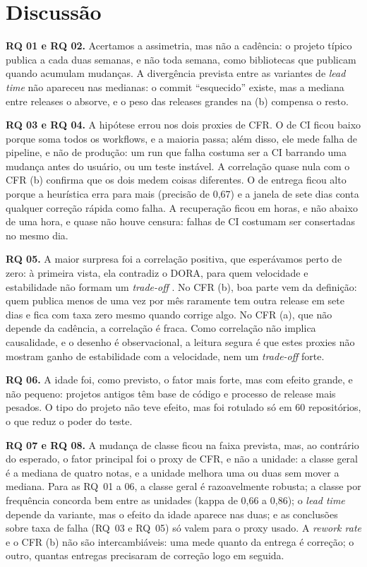 \documentclass[12pt]{article}
\begin{document}
\section{Discussão}
\label{sec:discussao}

\textbf{RQ 01 e RQ 02.} Acertamos a assimetria, mas não a cadência: o projeto
típico publica a cada duas semanas, e não toda semana, como bibliotecas que
publicam quando acumulam mudanças. A divergência prevista entre as variantes de
\emph{lead time} não apareceu nas medianas: o commit ``esquecido'' existe, mas a
mediana entre releases o absorve, e o peso das releases grandes na (b) compensa
o resto.

\textbf{RQ 03 e RQ 04.} A hipótese errou nos dois proxies de CFR. O de CI ficou
baixo porque soma todos os workflows, e a maioria passa; além disso, ele mede
falha de pipeline, e não de produção: um run que falha costuma ser a CI barrando
uma mudança antes do usuário, ou um teste instável. A correlação quase nula com
o CFR (b) confirma que os dois medem coisas diferentes. O de entrega ficou alto
porque a heurística erra para mais (precisão de 0,67) e a janela de sete dias
conta qualquer correção rápida como falha. A recuperação ficou em horas, e não
abaixo de uma hora, e quase não houve censura: falhas de CI costumam ser
consertadas no mesmo dia.

\textbf{RQ 05.} A maior surpresa foi a correlação positiva, que esperávamos
perto de zero: à primeira vista, ela contradiz o DORA, para quem velocidade e
estabilidade não formam um \emph{trade-off} \cite{forsgren2018}. No CFR (b), boa parte vem da
definição: quem publica menos de uma vez por mês raramente tem outra release em
sete dias e fica com taxa zero mesmo quando corrige algo. No CFR (a), que não
depende da cadência, a correlação é fraca. Como correlação não implica
causalidade, e o desenho é observacional, a leitura segura é que estes proxies
não mostram ganho de estabilidade com a velocidade, nem um \emph{trade-off}
forte.

\textbf{RQ 06.} A idade foi, como previsto, o fator mais forte, mas com efeito
grande, e não pequeno: projetos antigos têm base de código e processo de release
mais pesados. O tipo do projeto não teve efeito, mas foi rotulado só em 60
repositórios, o que reduz o poder do teste.

\textbf{RQ 07 e RQ 08.} A mudança de classe ficou na faixa prevista, mas, ao
contrário do esperado, o fator principal foi o proxy de CFR, e não a unidade: a classe geral é a mediana de
quatro notas, e a unidade melhora uma ou duas sem mover a mediana. Para as
RQ~01 a 06, a classe geral é razoavelmente robusta; a classe por frequência
concorda bem entre as unidades (kappa de 0,66 a 0,86); o \emph{lead time}
depende da variante, mas o efeito da idade aparece nas duas; e as conclusões
sobre taxa de falha (RQ~03 e RQ~05) só valem para o proxy usado. A \emph{rework
rate} e o CFR (b) não são intercambiáveis: uma mede quanto da entrega é
correção; o outro, quantas entregas precisaram de correção logo em seguida.
\end{document}
